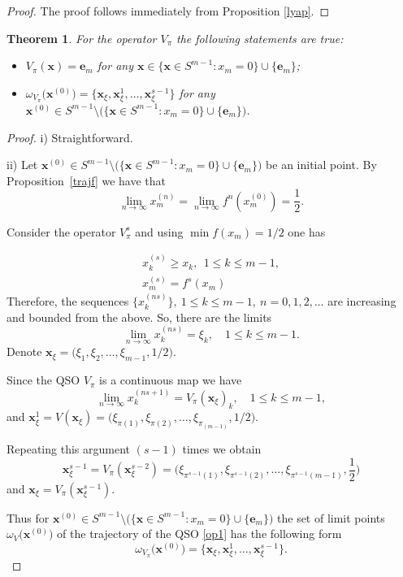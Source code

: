 \documentclass[11pt,reqno]{amsart}
\newtheorem{theorem}[subsection]{Theorem}
\numberwithin{equation}{section} \setcounter{tocdepth}{1}
\begin{document}
\begin{proof}
The proof follows immediately from Proposition \ref{lyap}.

\end{proof}

\begin{theorem} For the operator $V_\pi$ the following statements are true:
\begin{itemize}
\item[i)] $V_\pi(\mathbf{x})=\mathbf{e}_m $  for any $\mathbf{x}\in\{\mathbf{x}\in S^{m-1}: x_m=0\} \cup\{\mathbf{e}_m\}$;
\item[ii)]   $\omega_{V_\pi} \big(\mathbf{x}^{(0)}\big)=\{\mathbf{x}_\xi, \mathbf{x}_\xi^{1},\dots, \mathbf{x}_\xi^{s-1} \}$
for any $\mathbf{x}^{(0)}\in S^{m-1}\setminus \big(\{\mathbf{x}\in S^{m-1}: x_m=0\} \cup\{\mathbf{e}_m\}\big)$.
\end{itemize}
\end{theorem}


\begin{proof}  i) Straightforward.

ii) Let $\mathbf{x}^{(0)}\in S^{m-1}\setminus \big(\{\mathbf{x}\in S^{m-1}: x_m=0\} \cup\{\mathbf{e}_m\}\big)$ be an initial point. By Proposition~\ref{trajf}  we have that
\[\lim\limits_{n\rightarrow\infty} x_m^{(n)}=\lim\limits_{n\rightarrow\infty} f^n(x_m^{(0)})=\frac{1}{ 2}.\]

Consider the operator $V^s_\pi$  and using  $\min f(x_m)= 1/2$  one has

\begin{equation*}
\begin{array}{ll}
              x^{(s)}_{k}\geq  x_{k},   \ \ 1\leq k\leq m-1, \\[2mm]
              x^{(s)}_m=f^s(x_m)
\end{array}
\end{equation*}
Therefore, the sequences $\{ x^{(ns)}_{k}\}, \  1\leq k\leq m-1,  \ n=0,1,2,\dots$  are increasing
and bounded from the above. So, there are the limits
\[\lim\limits_{n\rightarrow\infty} x^{(ns)}_{k} =\xi_k, \quad   1\leq k\leq m-1.\]
Denote $\mathbf{x}_\xi=\big(\xi_1, \xi_2, \dots,\xi_{m-1}, 1/2\big)$.

Since the QSO $V_\pi$ is a continuous map we have
\[\lim\limits_{n\rightarrow\infty} x^{(ns+1)}_{k} =V_\pi(\mathbf{x}_\xi)_k, \quad   1\leq k\leq m-1,\]
and $\mathbf{x}_\xi^{1} =V(\mathbf{x}_\xi)=\big(\xi_{\pi(1)}, \xi_{\pi(2)}, \dots,\xi_{\pi_(m-1)}, 1/2\big)$.

Repeating this argument $(s-1)$ times we obtain
\[\mathbf{x}_\xi^{s-1} =V_\pi(\mathbf{x}_\xi^{s-2})=\Big(\xi_{\pi^{s-1}(1)}, \xi_{\pi^{s-1}(2)}, \dots,\xi_{\pi^{s-1}(m-1)}, \frac{1}{2}\Big)\]
and $\mathbf{x}_\xi =V_\pi(\mathbf{x}_\xi^{s-1})$.

Thus for $\mathbf{x}^{(0)}\in S^{m-1}\setminus \big(\{\mathbf{x}\in S^{m-1}: x_m=0\} \cup\{\mathbf{e}_m\}\big)$ the set
of limit points $\omega_V \big(\mathbf{x}^{(0)}\big)$ of the trajectory of the QSO \eqref{op1} has the following form
\[\omega_{V_\pi} \big(\mathbf{x}^{(0)}\big)=\{\mathbf{x}_\xi, \mathbf{x}_\xi^{1},\dots, \mathbf{x}_\xi^{s-1}\}. \]
\end{proof}
\end{document}
